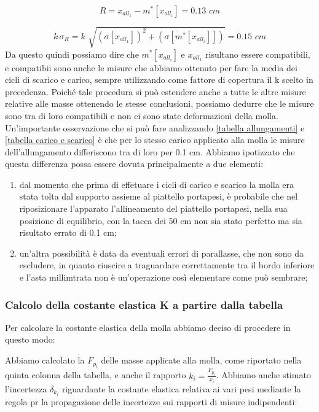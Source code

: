 \begin{equation*}
	R = x_{all_1} - m^*[x_{all_i}] = 0.13 \,\,cm
\end{equation*}

\begin{equation*}
	k\, \sigma_{R} = k\,\, \sqrt{(\sigma[x_{all_1}])^2 + (\sigma[m^*[x_{all_i}]])} = 0.15 \,\,cm
\end{equation*}
%
Da questo quindi possiamo dire che $m^*[x_{all_i}]$ e $x_{all_1}$ risultano essere compatibili, e compatibii sono anche le misure che abbiamo ottenuto per fare la media dei cicli di scarico e carico, sempre utilizzando come fattore di copertura il k scelto in precedenza.
Poiché tale procedura si può estendere anche a tutte le altre misure relative alle masse ottenendo le stesse conclusioni, possiamo dedurre che le misure sono tra di loro compatibili e non ci sono state deformazioni della molla.
Un'importante osservazione che si può fare analizzando \ref{tabella allungamenti} e \ref{tabella carico e scarico} è che per lo stesso carico applicato alla molla le misure dell'allungamento differiscono tra di loro per 0.1 cm. Abbiamo ipotizzato che questa differenza possa essere dovuta principalmente a due elementi:

\begin{enumerate}
	\item{dal momento che prima di effetuare i cicli di carico e scarico la molla era stata tolta dal supporto assieme al piattello portapesi, è probabile che nel riposizionare l'apparato l'allineamento del piattello portapesi, nella sua posizione di equilibrio, con la tacca dei 50 cm non sia stato perfetto ma sia risultato errato di 0.1 cm;}
	\item{un'altra possibilità è data da eventuali errori di parallasse, che non sono da escludere, in quanto riuscire a traguardare correttamente tra il bordo inferiore e l'asta millimtrata non è un'operazione così elementare come può sembrare;}
\end{enumerate}

\subsubsection{Calcolo della costante elastica K a partire dalla tabella}
Per calcolare la costante elastica della molla abbiamo deciso di procedere in questo modo:

Abbiamo calcolato la $F_{p_{i}}$ delle masse applicate alla molla, come riportato nella quinta colonna della tabella, e anche il rapporto $k_{i} = \frac{F_{p_{i}}}{x_{i}}$. Abbiamo anche stimato l'incertezza $\delta_{k_{i}}$ riguardante la costante elastica relativa ai vari pesi mediante la regola pr la propagazione delle incertezze sui rapporti di misure indipendenti:

